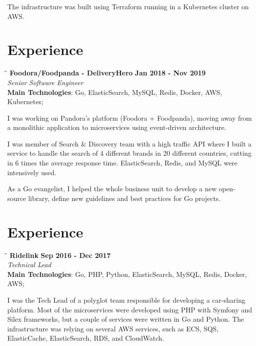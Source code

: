 \documentclass[margin]{res}
\begin{document}
\begin{resume}
The infrastructure was built using Terraform running in a Kubernetes cluster on AWS.

\section{Experience}
\vspace{-0.1in}
    \begin{tabbing}
    \hspace{2.3in}\= \hspace{1.7in}\= \kill %
    \textbf{Foodora/Foodpanda - DeliveryHero}    \>\>\textbf{Jan 2018 - Nov 2019}\\
    \textit{Senior Software Engineer}\\
    \textbf{Main Technologies}: Go, ElasticSearch, MySQL, Redis, Docker, AWS, Kubernetes;
    \end{tabbing}\vspace{-20pt}      %
    \vspace{2mm}
I was working on Pandora's platform (Foodora + Foodpanda), moving away from a monolithic application to microservices using event-driven architecture.

I was member of Search \& Discovery team with a high traffic API where I built a service to handle the search of 4 different brands in 20 different countries, cutting in 6 times the average response time. ElasticSearch, Redis, and MySQL were intensively used.

As a Go evangelist, I helped the whole business unit to develop a new open-source library, define new guidelines and best practices for Go projects.

\section{Experience}
\vspace{-0.1in}
    \begin{tabbing}
    \hspace{2.3in}\= \hspace{1.7in}\= \kill %
    \textbf{Ridelink}    \>\>\textbf{Sep 2016 - Dec 2017}\\
    \textit{Technical Lead}\\
    \textbf{Main Technologies}: Go, PHP, Python, ElasticSearch, MySQL, Redis, Docker, AWS;
    \end{tabbing}\vspace{-20pt}      %
    \vspace{2mm}
I was the Tech Lead of a polyglot team responsible for developing a car-sharing platform. Most of the microservices were developed using PHP with Symfony and Silex frameworks, but a couple of services were written in Go and Python. The infrastructure was relying on several AWS services, such as ECS, SQS, ElasticCache, ElasticSearch, RDS, and CloudWatch.


\end{resume}
\end{document}
